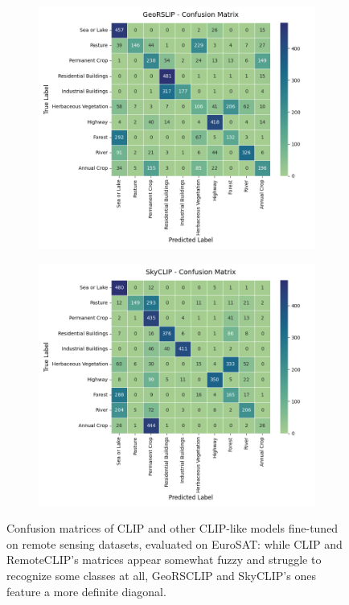 \documentclass[a4paper, oneside, english]{sapthesis} %
\begin{document}
\begin{figure}[h]
  \medskip

  \begin{subfigure}[t]{.5\textwidth}
    \centering
    \includegraphics[width=\linewidth]{img/EuroSAT_GeoRSCLIP_32_cm.png}
  \end{subfigure}
  \hfill
  \begin{subfigure}[t]{.5\textwidth}
    \centering
    \includegraphics[width=\linewidth]{img/EuroSAT_SkyCLIP_32_cm.png}
  \end{subfigure}
  \caption{Confusion matrices of CLIP and other CLIP-like models fine-tuned on remote sensing datasets, evaluated on EuroSAT: while CLIP and RemoteCLIP's matrices appear somewhat fuzzy and struggle to recognize some classes at all, GeoRSCLIP and SkyCLIP's ones feature a more definite diagonal.}
\end{figure}
\end{document}

